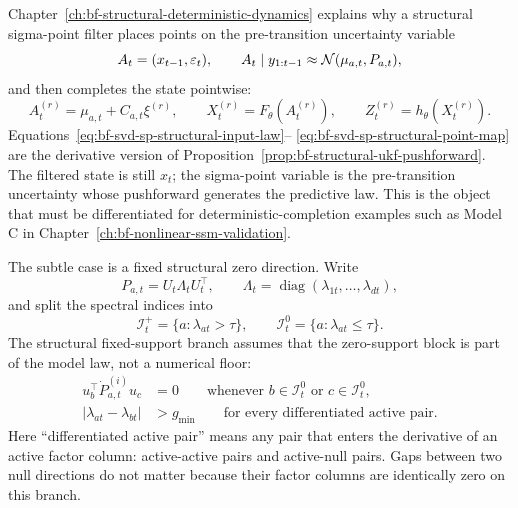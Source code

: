 Chapter~\ref{ch:bf-structural-deterministic-dynamics} explains why a
structural sigma-point filter places points on the pre-transition uncertainty
variable
\begin{equation}
\label{eq:bf-svd-sp-structural-input-law}
  A_t=(x_{t-1},\varepsilon_t),
  \qquad
  A_t\mid y_{1:t-1}\approx\mathcal{N}(\mu_{a,t},P_{a,t}),
\end{equation}
and then completes the state pointwise:
\begin{equation}
\label{eq:bf-svd-sp-structural-point-map}
  A_t^{(r)}=\mu_{a,t}+C_{a,t}\xi^{(r)},\qquad
  X_t^{(r)}=F_\theta(A_t^{(r)}),\qquad
  Z_t^{(r)}=h_\theta(X_t^{(r)}).
\end{equation}
Equations~\eqref{eq:bf-svd-sp-structural-input-law}--%
\eqref{eq:bf-svd-sp-structural-point-map} are the derivative version of
Proposition~\ref{prop:bf-structural-ukf-pushforward}.  The filtered state is
still $x_t$; the sigma-point variable is the pre-transition uncertainty whose
pushforward generates the predictive law.  This is the object that must be
differentiated for deterministic-completion examples such as Model C in
Chapter~\ref{ch:bf-nonlinear-ssm-validation}.

The subtle case is a fixed structural zero direction.  Write
\[
  P_{a,t}=U_t\Lambda_tU_t^\top,\qquad
  \Lambda_t=\operatorname{diag}(\lambda_{1t},\ldots,\lambda_{dt}),
\]
and split the spectral indices into
\[
  \mathcal I_t^+=\{a:\lambda_{at}>\tau\},\qquad
  \mathcal I_t^0=\{a:\lambda_{at}\le \tau\}.
\]
The structural fixed-support branch assumes that the zero-support block is
part of the model law, not a numerical floor:
\begin{align}
\label{eq:bf-svd-sp-fixed-support-null-conditions}
  u_b^\top \dot P_{a,t}^{(i)}u_c &=0
  \qquad
  \text{whenever } b\in\mathcal I_t^0
  \text{ or } c\in\mathcal I_t^0,\\
\label{eq:bf-svd-sp-fixed-support-gap-condition}
  |\lambda_{at}-\lambda_{bt}| &> g_{\min}
  \qquad
  \text{for every differentiated active pair.}
\end{align}
Here ``differentiated active pair'' means any pair that enters the derivative
of an active factor column: active-active pairs and active-null pairs.  Gaps
between two null directions do not matter because their factor columns are
identically zero on this branch.

